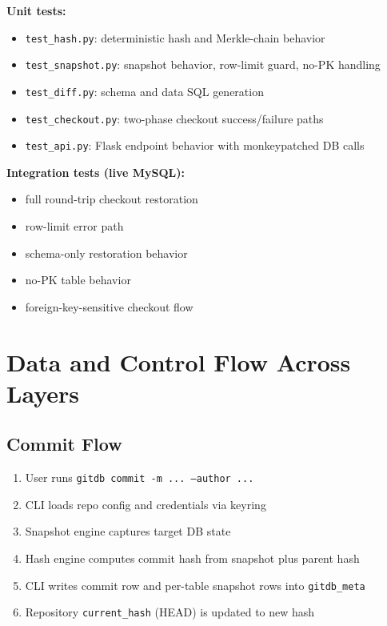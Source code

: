 \documentclass[12pt, a4paper]{article}
\begin{document}
\textbf{Unit tests:}
\begin{itemize}[leftmargin=1.5em]
    \item \texttt{test\_hash.py}: deterministic hash and Merkle-chain behavior
    \item \texttt{test\_snapshot.py}: snapshot behavior, row-limit guard, no-PK handling
    \item \texttt{test\_diff.py}: schema and data SQL generation
    \item \texttt{test\_checkout.py}: two-phase checkout success/failure paths
    \item \texttt{test\_api.py}: Flask endpoint behavior with monkeypatched DB calls
\end{itemize}

\textbf{Integration tests (live MySQL):}
\begin{itemize}[leftmargin=1.5em]
    \item full round-trip checkout restoration
    \item row-limit error path
    \item schema-only restoration behavior
    \item no-PK table behavior
    \item foreign-key-sensitive checkout flow
\end{itemize}

\section{Data and Control Flow Across Layers}

\subsection{Commit Flow}

\begin{enumerate}[leftmargin=1.5em]
    \item User runs \texttt{gitdb commit -m ... --author ...}
    \item CLI loads repo config and credentials via keyring
    \item Snapshot engine captures target DB state
    \item Hash engine computes commit hash from snapshot plus parent hash
    \item CLI writes commit row and per-table snapshot rows into \texttt{gitdb\_meta}
    \item Repository \texttt{current\_hash} (HEAD) is updated to new hash
\end{enumerate}
\end{document}
